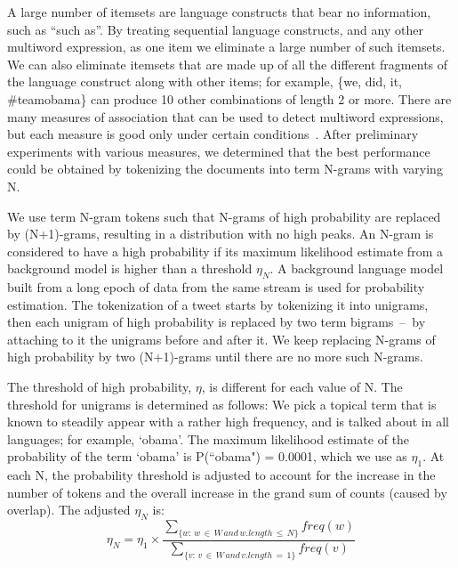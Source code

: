 \documentclass{sig-alternate}
\begin{document}
A large number of itemsets are language constructs that bear no information,
such as ``such as''. 
By treating sequential language constructs, and any other multiword expression,
as one item we eliminate a large number of such itemsets.
We can also eliminate itemsets that are made up of all the different fragments
of the language construct along with other items;
for example, \{we, did, it, \#teamobama\} can produce 10 other combinations of
length 2 or more.
There are many measures of association that can be used to detect multiword
expressions, but each measure is good only under certain conditions~\cite{ramisch2012broad,tan2002selecting}.
After preliminary experiments with various measures, we determined that
the best performance
could be obtained by tokenizing the documents into term N-grams with varying N. 

We use term N-gram tokens such that N-grams of high probability are replaced by
(N+1)-grams, resulting in a distribution with no high peaks.  
An N-gram is considered to 
have a high probability if its maximum likelihood estimate from a background
model is higher than a threshold $\eta_N$. 
A background language model built from a long epoch of data 
from the same stream is used for probability estimation.
The tokenization of a tweet starts by tokenizing it into unigrams, then each
unigram of high probability is replaced by two term bigrams~--~by
attaching to it the unigrams before and after it.
We keep replacing N-grams of high probability by two (N+1)-grams 
until there are no more such N-grams. 


The threshold of high probability, $\eta$, is different for each value of N. 
The threshold for unigrams is determined as follows: 
We pick a topical term that is known to  steadily  appear with a rather high frequency, 
and is talked about in all languages; for example, `obama'. 
The maximum likelihood estimate of the probability of the term `obama' 
is P(``obama") = 0.0001, which we use as $\eta_1$.
At each N, the probability threshold is adjusted to account for the increase
in the number of tokens and the overall increase in the grand sum of counts (caused by overlap).
The adjusted $\eta_N$ is:
\begin{equation}\eta_N = \eta_1 \times \frac{\sum_{\{w:\, w \,\in\, W\, and\, w.length \,\le\, N\}}{freq(w)}}{\sum_{\{v:\, v\, \in\, W \,and \,v.length\,=\,1\}}{freq(v)}}\end{equation}
\end{document}
